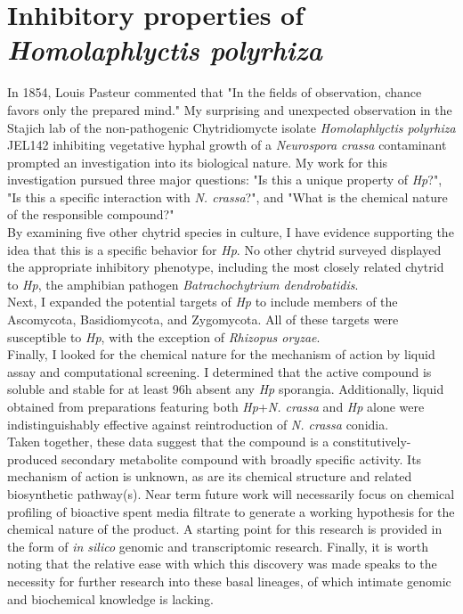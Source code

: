 \section{Inhibitory properties of \textit{Homolaphlyctis polyrhiza}}
In 1854, Louis Pasteur commented that "In the fields of observation, chance favors only the prepared mind." My surprising and unexpected observation in the Stajich lab of the non-pathogenic Chytridiomycte isolate \textit{Homolaphlyctis polyrhiza} JEL142 inhibiting vegetative hyphal growth of a \textit{Neurospora crassa} contaminant prompted an investigation into its biological nature. My work for this investigation pursued three major questions: "Is this a unique property of \textit{Hp}?", "Is this a specific interaction with \textit{N. crassa}?", and "What is the chemical nature of the responsible compound?"\\
\indent By examining five other chytrid species in culture, I have evidence supporting the idea that this is a specific behavior for \textit{Hp}. No other chytrid surveyed displayed the appropriate inhibitory phenotype, including the most closely related chytrid to \textit{Hp}, the amphibian pathogen \textit{Batrachochytrium dendrobatidis}.\\
\indent Next, I expanded the potential targets of \textit{Hp} to include members of the Ascomycota, Basidiomycota, and Zygomycota. All of these targets were susceptible to \textit{Hp}, with the exception of \textit{Rhizopus oryzae}.\\
\indent Finally, I looked for the chemical nature for the mechanism of action by liquid assay and computational screening. I determined that the active compound is soluble and stable for at least 96h absent any \textit{Hp} sporangia. Additionally, liquid obtained from preparations featuring both \textit{Hp}+\textit{N. crassa} and \textit{Hp} alone were indistinguishably effective against reintroduction of \textit{N. crassa} conidia.\\
\indent Taken together, these data suggest that the compound is a constitutively-produced secondary metabolite compound with broadly specific activity. Its mechanism of action is unknown, as are its chemical structure and related biosynthetic pathway(s). Near term future work will necessarily focus on chemical profiling of bioactive spent media filtrate to generate a working hypothesis for the chemical nature of the product. A starting point for this research is provided in the form of \textit{in silico} genomic and transcriptomic research. Finally, it is worth noting that the relative ease with which this discovery was made speaks to the necessity for further research into these basal lineages, of which intimate genomic and biochemical knowledge is lacking.\\
